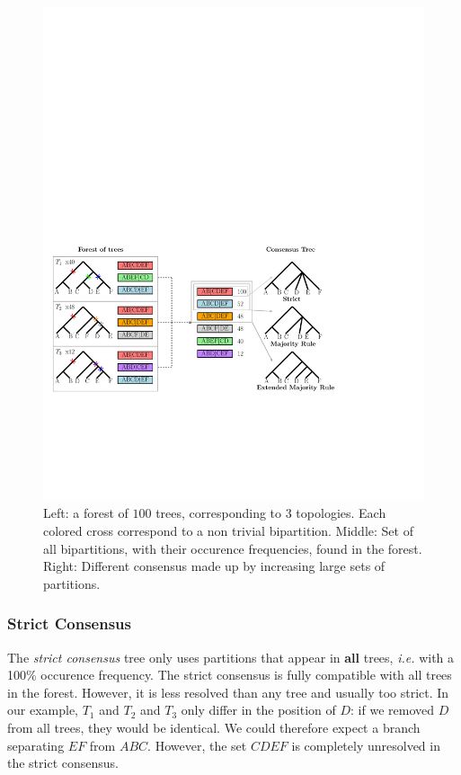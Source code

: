 \begin{figure}
 \includegraphics[width=0.9\linewidth]{Figs/consensus}
 \caption{Left: a forest of $100$ trees, corresponding to $3$ topologies. Each colored cross correspond to a non trivial bipartition. Middle: Set of all bipartitions, with their occurence frequencies, found in the forest. Right: Different consensus made up by increasing large sets of partitions.}
 \label{fig:consensus}
\end{figure}

\subsubsection{Strict Consensus}

The \emph{strict consensus} tree \citep{Rohlf1982} only uses partitions that appear in \textbf{all} trees, \emph{i.e.} with a 100\% occurence frequency. The strict consensus is fully compatible with all trees in the forest. However, it is less resolved than any tree and usually too strict. In our example, $T_1$ and $T_2$ and $T_3$ only differ in the position of $D$: if we removed $D$ from all trees, they would be identical. We could therefore expect a branch separating $EF$ from $ABC$. However, the set $CDEF$ is completely unresolved in the strict consensus.

